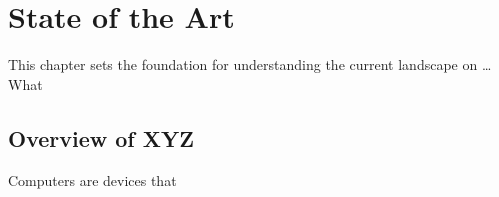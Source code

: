 \chapter{State of the Art}\label{chap:art}
This chapter sets the foundation for understanding the current landscape on \ldots
What
\section{Overview of XYZ}
Computers are devices that

